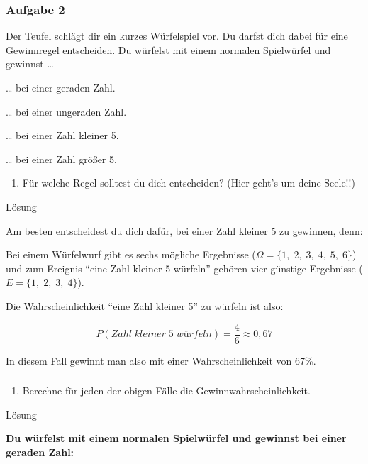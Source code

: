 \documentclass[
  ngerman,
]{book}
\providecommand{\tightlist}{%
  \setlength{\itemsep}{0pt}\setlength{\parskip}{0pt}}
\begin{document}
\hypertarget{aufgabe-2-10}{%
\subsubsection*{Aufgabe 2}\label{aufgabe-2-10}}

Der Teufel schlägt dir ein kurzes Würfelspiel vor. Du darfst dich dabei für eine Gewinnregel entscheiden. Du würfelst mit einem normalen Spielwürfel und gewinnst \ldots{}

\ldots{} bei einer geraden Zahl.

\ldots{} bei einer ungeraden Zahl.

\ldots{} bei einer Zahl kleiner 5.

\ldots{} bei einer Zahl größer 5.

\begin{enumerate}
\def\labelenumi{\alph{enumi})}
\tightlist
\item
  Für welche Regel solltest du dich entscheiden? (Hier geht's um deine Seele!!)
\end{enumerate}

Lösung

Am besten entscheidest du dich dafür, bei einer Zahl kleiner 5 zu gewinnen, denn:

Bei einem Würfelwurf gibt es sechs mögliche Ergebnisse (\(\Omega=\{1,\;2,\;3,\;4,\;5,\;6\}\)) und zum Ereignis ``eine Zahl kleiner 5 würfeln'' gehören vier günstige Ergebnisse (\(E=\{1,\;2,\;3,\;4\}\)).

Die Wahrscheinlichkeit ``eine Zahl kleiner 5'' zu würfeln ist also:

\[P(Zahl\;kleiner\;5\;würfeln)=\frac{4}{6} \approx 0,67\]

In diesem Fall gewinnt man also mit einer Wahrscheinlichkeit von 67\%.

\hypertarget{section-92}{%
\subsubsection*{}\label{section-92}}

\begin{enumerate}
\def\labelenumi{\alph{enumi})}
\setcounter{enumi}{1}
\tightlist
\item
  Berechne für jeden der obigen Fälle die Gewinnwahrscheinlichkeit.
\end{enumerate}

Lösung

\textbf{Du würfelst mit einem normalen Spielwürfel und gewinnst bei einer geraden Zahl:}
\end{document}
